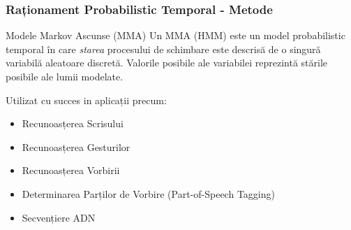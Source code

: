 \begin{frame}[t]
    \frametitle{Raționament Probabilistic Temporal - Metode}
  
  \begin{block}{Modele Markov Ascunse (MMA)}
	Un MMA (HMM) este un model probabilistic temporal în care \emph{starea} procesului de schimbare este descrisă
	de \alert{o singură variabilă aleatoare discretă}.
	Valorile posibile ale variabilei reprezintă stările posibile ale lumii modelate.
  \end{block}
  
  \vspace*{1em}
  
  Utilizat cu succes in aplicații precum:
  \begin{itemize}
  	\item Recunoasțerea Scrisului
  	\item Recunoasțerea Gesturilor
  	\item Recunoasțerea Vorbirii
  	\item Determinarea Parților de Vorbire (Part-of-Speech Tagging)
  	\item Secvențiere ADN
  \end{itemize}
\end{frame}

